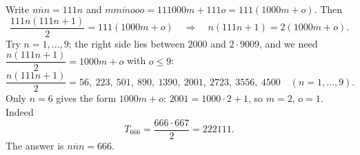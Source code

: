 Write $\overline{nnn}=111n$ and $\overline{mmmooo}=111000m+111o=111(1000m+o)$. Then
\[
\dfrac{111n(111n+1)}{2}=111(1000m+o)\quad\Longrightarrow\quad n(111n+1)=2(1000m+o).
\]
Try $n=1,\dots,9$; the right side lies between $2000$ and $2\cdot9009$, and we need $\dfrac{n(111n+1)}{2}=1000m+o$ with $o\le9$:
\[
\dfrac{n(111n+1)}{2}=56,\ 223,\ 501,\ 890,\ 1390,\ 2001,\ 2723,\ 3556,\ 4500\quad(n=1,\dots,9).
\]
Only $n=6$ gives the form $1000m+o$: $2001=1000\cdot2+1$, so $m=2$, $o=1$. Indeed
\[
T_{666}=\dfrac{666\cdot667}{2}=222111 .
\]
The answer is $\overline{nnn}=\boxed{666}$.
